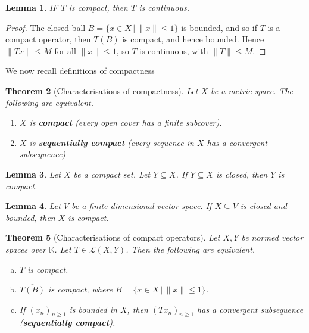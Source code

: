 \documentclass[10pt, oneside, reqno]{amsart}
\theoremstyle{plain}%
\newtheorem{thm}{Theorem}[section]
\newtheorem{lem}[thm]{Lemma}
\theoremstyle{definition}
\theoremstyle{remark}
\newcommand{\given}{ \, | \,}
\newcommand{\K}{\mathbb{K}}
\begin{document}
\begin{lem}
    IF $T$ is compact, then $T$ is continuous.
\end{lem}
\begin{proof}
    The closed ball $B  = \{ x \in X \given \| x \| \leq 1 \}$ is bounded, and so if $T$ is a compact operator, then $\overline{T(B)}$ is compact, and hence bounded.  Hence $\| Tx \| \leq M$ for all $\| x \| \leq 1$, so $T$ is continuous, with $\| T \| \leq M$.  
\end{proof}

We now recall definitions of compactness
\begin{thm}[Characterisations of compactness]
    Let $X$ be a metric space. The following are equivalent.  
    \begin{enumerate}[(1)]
        \item $X$ is \textbf{compact} (every open cover has a finite subcover).
        \item $X$ is \textbf{sequentially compact} (every sequence in $X$ has a convergent subsequence)
    \end{enumerate}
\end{thm}

\begin{lem}
    Let $X$ be a compact set.  Let $Y \subseteq X$. If $Y \subseteq X$ is closed, then $Y$ is compact.
\end{lem}

\begin{lem}
    Let $V$ be a finite dimensional vector space.  If $X \subseteq V$ is closed and bounded, then $X$ is compact.
\end{lem}

\begin{thm}[Characterisations of compact operators]
    \label{thm:charcompact}
    Let $X, Y$ be normed vector spaces over $\K$.  Let $T \in \mathcal L(X,Y)$.  Then the following are equivalent.
    \begin{enumerate}[(a)]
        \item $T$ is compact.
        \item $\overline{T(B)}$ is compact, where $B = \{ x \in X \given \| x \| \leq 1 \}$.  
        \item If $(x_n)_{n \geq 1}$ is bounded in $X$, then $(Tx_n)_{n \geq 1}$ has a convergent subsequence (\textbf{sequentially compact}).
    \end{enumerate}
\end{thm}
\end{document}
